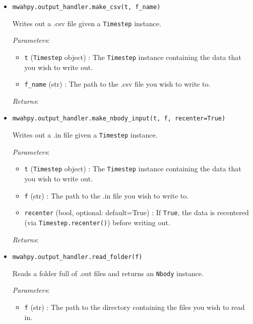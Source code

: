 \documentclass{article}
\begin{document}
\begin{itemize}



\item \verb!mwahpy.output_handler.make_csv(t, f_name)!

Writes out a .csv file given a \verb!Timestep! instance.

\textit{Parameters}: \begin{itemize}

\item \verb!t! (\verb!Timestep! object) : The \verb!Timestep! instance containing the data that you wish to write out.

\item \verb!f_name! (str) : The path to the .csv file you wish to write to.

\end{itemize}

\textit{Returns}:



\item \verb!mwahpy.output_handler.make_nbody_input(t, f, recenter=True)!

Writes out a .in file given a \verb!Timestep! instance.

\textit{Parameters}: \begin{itemize}

\item \verb!t! (\verb!Timestep! object) : The \verb!Timestep! instance containing the data that you wish to write out.

\item \verb!f! (str) : The path to the .in file you wish to write to.

\item \verb!recenter! (bool, optional: default=True) : If \verb!True!, the data is recentered (via \verb!Timestep.recenter()!) before writing out.

\end{itemize}

\textit{Returns}:



\item \verb!mwahpy.output_handler.read_folder(f)!

Reads a folder full of .out files and returns an \verb!Nbody! instance.

\textit{Parameters}: \begin{itemize}

\item \verb!f! (str) : The path to the directory containing the files you wish to read in.


\end{itemize}
\end{itemize}
\end{document}
